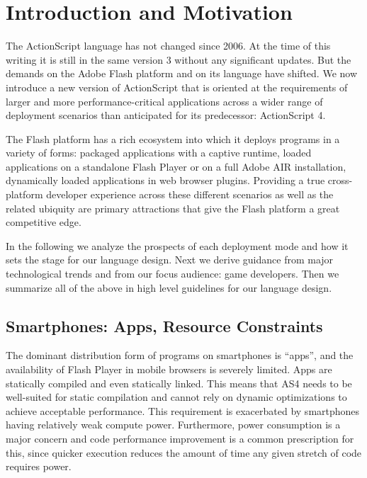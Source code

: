 



\section{Introduction and Motivation}
The ActionScript\textsuperscript{\textregistered} language has not changed since
2006. At the time of this writing it is still in the same version 3 without any
significant updates.
But the demands on the Adobe\textsuperscript{\textregistered}
Flash\textsuperscript{\textregistered} platform and on its language have
shifted. We now introduce a new version of ActionScript that is oriented at the
requirements of larger and more performance-critical applications across a wider
range of deployment scenarios than anticipated for its predecessor: ActionScript
4.

The Flash platform has a rich ecosystem into which it deploys programs in a
variety of forms: packaged applications with a captive runtime, loaded
applications on a standalone Flash Player or on a full Adobe
AIR\textsuperscript{\textregistered} installation, dynamically loaded
applications in web browser plugins. Providing a true cross-platform developer
experience across these different scenarios as well as the related ubiquity are
primary attractions that give the Flash platform a great competitive edge.

In the following we analyze the prospects of each deployment mode and how it
sets the stage for our language design. Next we derive guidance from major
technological trends and from our focus audience: game developers.
Then we summarize all of the above in high level guidelines for our language
design.

\subsection{Smartphones: Apps, Resource Constraints}
The dominant distribution form of programs on smartphones is ``apps'', and the
availability of Flash Player in mobile browsers is severely limited. Apps are
statically compiled and even statically linked. This means that AS4 needs to be
well-suited for static compilation and cannot rely on dynamic optimizations to
achieve acceptable performance. This requirement is exacerbated by smartphones
having relatively weak compute power. Furthermore, power consumption is a major
concern and code performance improvement is a common prescription for this,
since quicker execution reduces the amount of time any given stretch of code
requires power.

